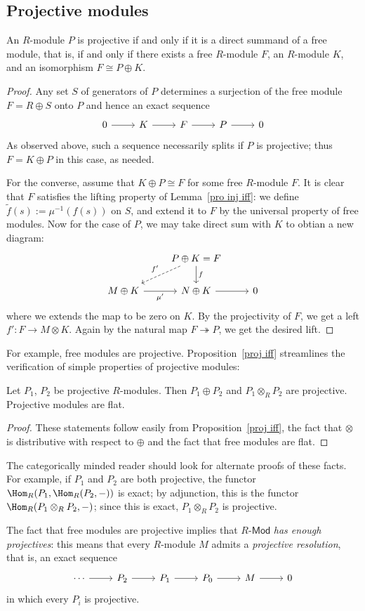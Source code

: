 \subsection{Projective modules}
\begin{proposition}\label{proj iff}
An $R$-module $P$ is projective if and only if it is a direct summand of a free module, that is, if and only if there exists a free $R$-module $F$, an $R$-module $K$, and an isomorphism $F\cong P\oplus K$.
\end{proposition}
\begin{proof}
Any set $S$ of generators of $P$ determines a surjection of the free module $F=R\oplus S$ onto $P$ and hence an exact sequence
\[\begin{tikzcd}
0\ar[r]&K\ar[r]&F\ar[r]&P\ar[r]&0
\end{tikzcd}\]
As observed above, such a sequence necessarily splits if $P$ is projective; thus $F=K\oplus P$ in this case, as needed.\par
For the converse, assume that $K\oplus P\cong F$ for some free $R$-module $F$. It is clear that $F$ satisfies the lifting property of Lemma~\ref{pro inj iff}: we define $\widetilde{f}(s):=\mu^{-1}(f(s))$ on $S$, and extend it to $F$ by the universal property of free modules. Now for the case of $P$, we may take direct sum with $K$ to obtian a new diagram:
\[\begin{tikzcd}
&P\oplus K=F\ar[ld,dashed,swap,"f'"]\ar[d,"f"]&\\
M\oplus K\ar[r,swap,"\mu'"]&N\oplus K\ar[r]&0
\end{tikzcd}\]
where we extends the map to be zero on $K$. By the projectivity of $F$, we get a left $f':F\to M\otimes K$. Again by the natural map $F\twoheadrightarrow P$, we get the desired lift.
\end{proof}
For example, free modules are projective. Proposition~\ref{proj iff} streamlines the verification
of simple properties of projective modules:
\begin{corollary}
Let $P_1$, $P_2$ be projective $R$-modules. Then $P_1\oplus P_2$ and $P_1\otimes_{R}P_2$ are projective. Projective modules are flat.
\end{corollary}
\begin{proof}
These statements follow easily from Proposition~\ref{proj iff}, the fact that $\otimes$ is distributive with respect to $\oplus$ and the fact that free modules are flat.
\end{proof}
The categorically minded reader should look for alternate proofs of these facts. For example, if $P_1$ and $P_2$ are both projective, the functor $\Hom_R(P_1,\Hom_R(P_2,-))$ is exact; by adjunction, this is the functor $\Hom_R(P_1\otimes_{R}P_2,-)$; since this is exact, $P_1\otimes_{R}P_2$ is projective.\par
The fact that free modules are projective implies that $R$-$\mathsf{Mod}$ \textit{has enough projectives}: this means that every $R$-module $M$ admits a \textit{projective resolution}, that is, an exact sequence
\[\begin{tikzcd}
\cdots\ar[r]&P_2\ar[r]&P_1\ar[r]&P_0\ar[r]&M\ar[r]&0
\end{tikzcd}\]
in which every $P_i$ is projective.

